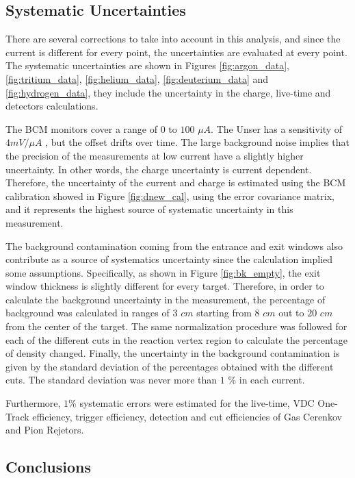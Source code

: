 \documentclass[final,5p,times,twocolumn]{elsarticle}
\begin{document}
\subsection{Systematic Uncertainties}

There are several corrections to take into account in this analysis, and since the current is different for every point, the uncertainties are evaluated at every point.  The systematic uncertainties are shown in Figures  \ref{fig:argon_data}, \ref{fig:tritium_data}, \ref{fig:helium_data}, \ref{fig:deuterium_data} and \ref{fig:hydrogen_data},  they   include the uncertainty in the charge, live-time and detectors calculations.

The BCM monitors cover a range of $0$ to $100$ $\mu A$. The Unser has a sensitivity of $4 mV/ \mu A$ \citep{denard}, but the offset drifts over time. The large background noise implies that the precision of the measurements at low current have a slightly higher uncertainty. In other words, the charge uncertainty is current dependent. Therefore, the uncertainty of the current and charge is estimated using the BCM calibration showed in Figure \ref{fig:dnew_cal}, using the error covariance matrix, and it represents the highest source of systematic uncertainty in this measurement.


The background contamination coming from the entrance and exit windows also contribute as a source of systematics uncertainty since the calculation implied some assumptions. Specifically, as shown in Figure \ref{fig:bk_empty}, the exit window thickness is slightly different for every target. Therefore, in order to calculate the background uncertainty in the measurement, the percentage of background was calculated in ranges of $3$ $cm$ starting from $8$ $cm$ out to $20$ $cm$ from the center of the target.  The same normalization procedure was followed for each of the different cuts in the reaction vertex region to calculate the percentage of density changed. Finally, the uncertainty in the background contamination is given by the standard deviation of the percentages obtained with the different cuts. The standard deviation was never more than $1$ $\% $ in each current.

Furthermore, $1\% $ systematic errors were estimated for the live-time, VDC One-Track efficiency, trigger efficiency, detection and cut efficiencies of Gas Cerenkov and Pion Rejetors.

\subsection {Conclusions }
\end{document}

